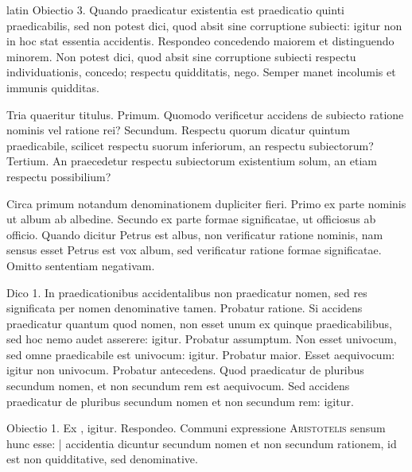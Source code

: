 \begin{otherlanguage*}{latin}
\pstart
  Obiectio 3. Quando praedicatur existentia est praedicatio quinti praedicabilis, sed non potest dici, quod absit sine corruptione subiecti: igitur non in hoc stat essentia accidentis. Respondeo concedendo maiorem et distinguendo minorem. Non potest dici, quod absit sine corruptione subiecti respectu individuationis, concedo; respectu quidditatis, nego. Semper manet incolumis et immunis quidditas. 
\pend

        \pstart
        \pend
      
\pstart
  Tria quaeritur titulus. Primum. Quomodo verificetur accidens de subiecto ratione nominis vel ratione rei? Secundum. Respectu quorum dicatur quintum praedicabile, scilicet respectu suorum inferiorum, an respectu subiectorum? Tertium. An praecedetur respectu subiectorum existentium solum, an etiam respectu possibilium? 
\pend

\pstart
  Circa primum notandum denominationem dupliciter fieri. Primo ex parte nominis ut album ab albedine. Secundo ex parte formae significatae, ut officiosus ab officio. Quando dicitur Petrus est albus, non verificatur ratione nominis, nam sensus esset Petrus est vox album, sed verificatur ratione formae significatae. Omitto sententiam negativam. 
\pend

\pstart
  Dico 1. In praedicationibus accidentalibus non praedicatur nomen, sed res significata per nomen denominative tamen. Probatur ratione. Si accidens praedicatur quantum quod nomen, non esset unum ex quinque praedicabilibus, sed hoc nemo audet asserere: igitur. Probatur assumptum. Non esset univocum, sed omne praedicabile est univocum: igitur. Probatur maior. Esset aequivocum: igitur non univocum. Probatur antecedens. Quod praedicatur de pluribus secundum nomen, et non secundum rem est aequivocum. Sed accidens praedicatur de pluribus secundum nomen et non secundum rem: igitur. 
\pend

\pstart
  Obiectio 1. Ex ,  igitur. Respondeo. Communi expressione \textsc{Aristotelis} sensum hunc esse: \textnormal{|} accidentia dicuntur secundum nomen et non secundum rationem, id est non quidditative, sed denominative. 
\pend


\end{otherlanguage*}

